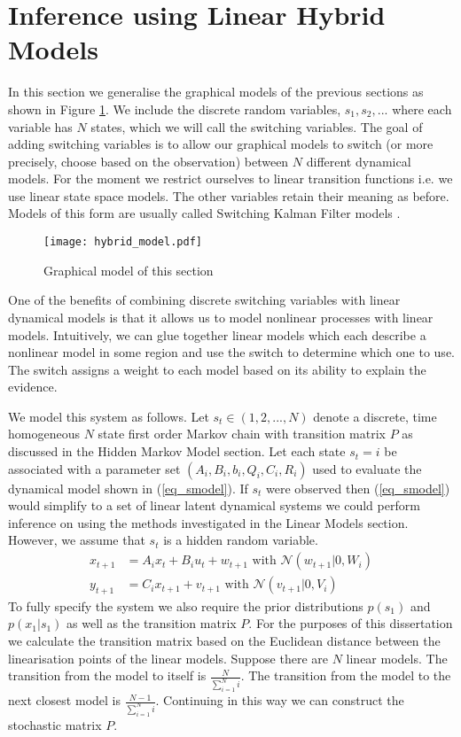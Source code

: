 \section{Inference using Linear Hybrid Models}
In this section we generalise the graphical models of the previous sections as shown in Figure \ref{fig_hybridmod1}. We include the discrete random variables, $s_1, s_2,...$ where each variable has $N$ states, which we will call the switching variables. The goal of adding switching variables is to allow our graphical models to switch (or more precisely, choose based on the observation) between $N$ different dynamical models. For the moment we restrict ourselves to linear transition functions i.e. we use linear state space models. The other variables retain their meaning as before. Models of this form are usually called Switching Kalman Filter models \cite{murphy1}. 
\begin{figure}[H] 
\centering
\texttt{[image: hybrid\_model.pdf]}
\caption{Graphical model of this section}
\label{fig_hybridmod1}
\end{figure}
One of the benefits of combining discrete switching variables with linear dynamical models is that it allows us to model nonlinear processes with linear models. Intuitively, we can glue together linear models which each describe a nonlinear model in some region and use the switch to determine which one to use. The switch assigns a weight to each model based on its ability to explain the evidence. 

We model this system as follows. Let $s_t \in (1,2,..., N)$ denote a discrete, time homogeneous $N$ state first order Markov chain with transition matrix $P$ as discussed in the Hidden Markov Model section. Let each state $s_t=i$ be associated with a parameter set $\left(A_i, B_i, b_i, Q_i, C_i, R_i \right)$ used to evaluate the dynamical model shown in (\ref{eq_smodel}). If $s_t$ were observed then (\ref{eq_smodel}) would simplify to a set of linear latent dynamical systems we could perform inference on using the methods investigated in the Linear Models section. However, we assume that $s_t$ is a hidden random variable.
\begin{equation}
\begin{aligned}
x_{t+1} &= A_ix_t + B_iu_t + w_{t+1} \text{ with } \mathcal{N}(w_{t+1}|0,W_i) \\
y_{t+1} &= C_ix_{t+1} + v_{t+1}  \text{ with } \mathcal{N}(v_{t+1}|0,V_i)
\end{aligned}
\label{eq_smodel}
\end{equation}
To fully specify the system we also require the prior distributions $p(s_1)$ and $p(x_1|s_1)$ as well as the transition matrix $P$. For the purposes of this dissertation we calculate the transition matrix based on the Euclidean distance between the linearisation points of the linear models. Suppose there are $N$ linear models. The transition from the model to itself is $\frac{N}{\sum_{i=1}^N i}$. The transition from the model to the next closest model is $\frac{N-1}{\sum_{i=1}^N i}$. Continuing in this way we can construct the stochastic matrix $P$.

